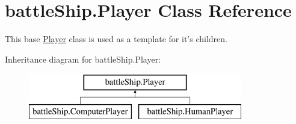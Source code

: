 \hypertarget{classbattleShip_1_1Player}{\section{battle\-Ship.\-Player Class Reference}
\label{classbattleShip_1_1Player}
}


This base \hyperlink{classbattleShip_1_1Player}{Player} class is used as a template for it's children.  


Inheritance diagram for battle\-Ship.\-Player\-:\begin{figure}[H]
\begin{center}
\leavevmode
\includegraphics[height=2.000000cm]{classbattleShip_1_1Player}
\end{center}
\end{figure}
